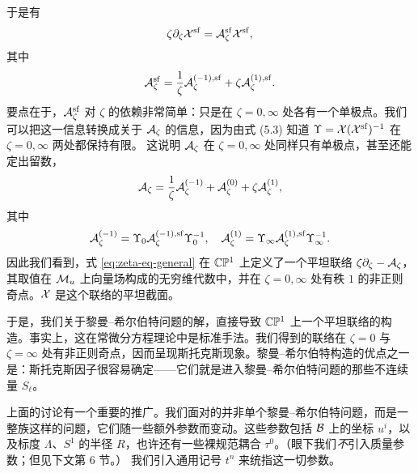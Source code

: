 于是有
\begin{equation} \label{eq:zeta-eq-sf}
\zeta \partial_\zeta \mathcal{X}^{\mathrm{sf}} = \mathcal{A}^{\mathrm{sf}}_\zeta \mathcal{X}^{\mathrm{sf}},
\end{equation}
其中
\begin{equation}
\mathcal{A}^{\mathrm{sf}}_\zeta = \frac{1}{\zeta} \mathcal{A}_\zeta^{(-1),{\mathrm{sf}}} + \zeta \mathcal{A}_\zeta^{(1),{\mathrm{sf}}}.
\end{equation}
要点在于，$\mathcal{A}^{\mathrm{sf}}_\zeta$ 对 $\zeta$ 的依赖非常简单：只是在 $\zeta = 0,\infty$ 处各有一个单极点。我们可以把这一信息转换成关于 $\mathcal{A}_\zeta$ 的信息，因为由式 (5.3) 知道 $\Upsilon = \mathcal{X} (\mathcal{X}^{\mathrm{sf}})^{-1}$ 在 $\zeta = 0, \infty$ 两处都保持有限。%
这说明 $\mathcal{A}_\zeta$ 在 $\zeta = 0, \infty$ 处同样只有单极点，甚至还能定出留数，
\begin{equation}
\mathcal{A}_\zeta = \frac{1}{\zeta}\mathcal{A}_\zeta^{(-1)} + \mathcal{A}_\zeta^{(0)} +  \zeta \mathcal{A}_\zeta^{(1)},
\end{equation}
其中
\begin{equation}
\mathcal{A}_\zeta^{(-1)} = \Upsilon_0 \mathcal{A}_\zeta^{(-1),{\mathrm{sf}}} \Upsilon_0^{-1}, \quad \mathcal{A}_\zeta^{(1)} = \Upsilon_\infty \mathcal{A}_\zeta^{(1),{\mathrm{sf}}} \Upsilon_\infty^{-1}.
\end{equation}
因此我们看到，式 \eqref{eq:zeta-eq-general} 在 $\mathbb{C}\mathbb{P}^1$ 上定义了一个平坦联络 $\zeta \partial_\zeta - \mathcal{A}_\zeta$，其取值在 $\mathcal{M}_u$ 上向量场构成的无穷维代数中，并在 $\zeta = 0, \infty$ 处有秩 $1$ 的非正则奇点。$\mathcal{X}$ 是这个联络的平坦截面。

于是，我们关于黎曼--希尔伯特问题的解，直接导致 $\mathbb{C}\mathbb{P}^1$ 上一个平坦联络的构造。事实上，这在常微分方程理论中是标准手法。我们得到的联络在 $\zeta = 0$ 与 $\zeta = \infty$ 处有非正则奇点，因而呈现斯托克斯现象。黎曼--希尔伯特构造的优点之一是：斯托克斯因子很容易确定——它们就是进入黎曼--希尔伯特问题的那些不连续量 $S_\ell$。

上面的讨论有一个重要的推广。我们面对的并非单个黎曼--希尔伯特问题，而是一整族这样的问题，它们随一些额外参数而变动。这些参数包括 $\mathcal{B}$ 上的坐标 $u^i$，以及标度 $\Lambda$、$S^1$ 的半径 $R$，也许还有一些裸规范耦合 $\tau^0$。（眼下我们\emph{不}引入质量参数；但见下文第 6 节。）%
我们引入通用记号 $t^n$ 来统指这一切参数。

